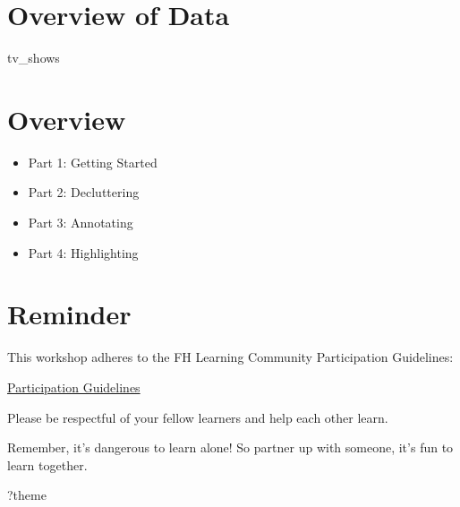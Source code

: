 \documentclass[
  letterpaper,
  DIV=11,
  numbers=noendperiod]{scrreprt}
\newenvironment{Shaded}{\begin{snugshade}}{\end{snugshade}}
\newcommand{\NormalTok}[1]{\textcolor[rgb]{0.00,0.23,0.31}{#1}}
\providecommand{\tightlist}{%
  \setlength{\itemsep}{0pt}\setlength{\parskip}{0pt}}\usepackage{longtable,booktabs,array}
\begin{document}
\section*{Overview of Data}\label{overview-of-data}


\begin{Shaded}
\begin{Highlighting}[]
\NormalTok{tv\_shows}
\end{Highlighting}
\end{Shaded}

\section*{Overview}\label{overview}


\begin{itemize}
\tightlist
\item
  Part 1: Getting Started
\item
  Part 2: Decluttering
\item
  Part 3: Annotating
\item
  Part 4: Highlighting
\end{itemize}

\section*{Reminder}\label{reminder}


This workshop adheres to the FH Learning Community Participation
Guidelines:

\href{https://hutchdatascience.org/communitystudios/guidelines/}{Participation
Guidelines}

Please be respectful of your fellow learners and help each other learn.

Remember, it's dangerous to learn alone! So partner up with someone,
it's fun to learn together.

\begin{Shaded}
\begin{Highlighting}[]
\NormalTok{?theme}
\end{Highlighting}
\end{Shaded}

\end{document}
